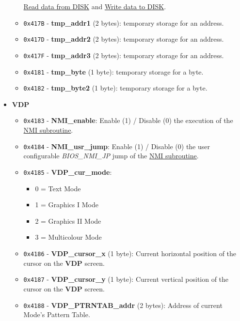 \documentclass[a4paper,11pt]{article}
\begin{document}
\begin{itemize}
\begin{itemize}
            \hyperref[sec:howto_readdata]{Read data from DISK} and 
            \hyperref[sec:howto_writedata]{Write data to DISK}.
            \item \texttt{0x417B} - \textbf{tmp\_addr1} (2 bytes): temporary
            storage for an address.
            \item \texttt{0x417D} - \textbf{tmp\_addr2} (2 bytes): temporary
            storage for an address.
            \item \texttt{0x417F} - \textbf{tmp\_addr3} (2 bytes): temporary
            storage for an address.
            \item \texttt{0x4181} - \textbf{tmp\_byte} (1 byte): temporary
            storage for a byte.
            \item \texttt{0x4182} - \textbf{tmp\_byte2} (1 byte): temporary
            storage for a byte.
        \end{itemize}
        \item \textbf{VDP}
        \begin{itemize}
            \item \texttt{0x4183} - \textbf{NMI\_enable}: Enable (1) / Disable
            (0) the execution of the \hyperref[sec:nmi]{NMI subroutine}.
            \item \texttt{0x4184} - \textbf{NMI\_usr\_jump}: Enable (1) / Disable
            (0) the user configurable \textit{BIOS\_NMI\_JP} jump of the 
            \hyperref[sec:nmi]{NMI subroutine}.
            \item \texttt{0x4185} - \textbf{VDP\_cur\_mode}:
            \begin{itemize}
                \item 0 = Text Mode
                \item 1 = Graphics I Mode
                \item 2 = Graphics II Mode
                \item 3 = Multicolour Mode
            \end{itemize}
            \item \texttt{0x4186} - \textbf{VDP\_cursor\_x} (1 byte): Current
            horizontal position of the cursor on the \textbf{VDP} screen.
            \item \texttt{0x4187} - \textbf{VDP\_cursor\_y} (1 byte): Current
            vertical position of the cursor on the \textbf{VDP} screen.
            \item \texttt{0x4188} - \textbf{VDP\_PTRNTAB\_addr} (2 bytes):
            Address of current Mode’s Pattern Table.

\end{itemize}
\end{itemize}
\end{document}
